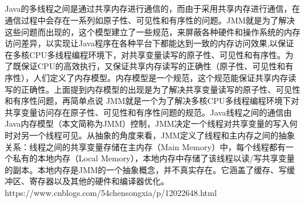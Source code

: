 \documentclass[../../../interview-questions.tex]{subfiles}
\begin{document}
\subsection{\color{red}{Java内存模型(Java Memory Model)}}

Java的多线程之间是通过共享内存进行通信的，而由于采用共享内存进行通信，在通信过程中会存在一系列如原子性、可见性和有序性的问题。JMM就是为了解决这些问题而出现的，这个模型建立了一些规范，来屏蔽各种硬件和操作系统的内存访问差异，以实现让Java程序在各种平台下都能达到一致的内存访问效果,以保证在多核CPU多线程编程环境下，对共享变量读写的原子性、可见性和有序性。为了既保证CPU的高效执行，又保证共享内存读写的正确性（原子性、可见性和有序性），人们定义了内存模型。内存模型是一个规范，这个规范能保证共享内存读写的正确性。上面提到内存模型的出现是为了解决共享变量读写的原子性、可见性和有序性问题，再简单点说 JMM就是一个为了解决多核CPU多线程编程环境下对共享变量访问存在原子性、可见性和有序性问题的规范。Java线程之间的通信由Java内存模型（本文简称为JMM）控制，JMM决定一个线程对共享变量的写入何时对另一个线程可见。从抽象的角度来看，JMM定义了线程和主内存之间的抽象关系：线程之间的共享变量存储在主内存（Main Memory）中，每个线程都有一个私有的本地内存（Local Memory），本地内存中存储了该线程以读/写共享变量的副本。本地内存是JMM的一个抽象概念，并不真实存在。它涵盖了缓存、写缓冲区、寄存器以及其他的硬件和编译器优化。https://www.cnblogs.com/54chensongxia/p/12022648.html
\end{document}
